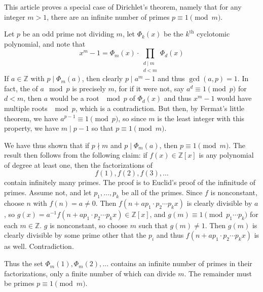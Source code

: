 \documentclass[12pt]{article}
\newcommand{\Ints}{\mathbb{Z}}
\begin{document}
This article proves a special case of Dirichlet's theorem, namely that for any integer $m>1$, there are an infinite number of primes $p\equiv 1\pmod m$. 

Let $p$ be an odd prime not dividing $m$, let $\Phi_k(x)$ be the $k^{\mathrm{th}}$ cyclotomic polynomial, and note that
\[x^m-1=\Phi_m(x)\cdot\prod_{\substack{d\mid m\\d<m}} \Phi_d(x)\]
If $a\in\Ints$ with $p\mid\Phi_m(a)$, then clearly $p\mid a^m-1$ and thus $\gcd(a,p)=1$. In fact, the  of $a\mod p$ is precisely $m$, for if it were not, say $a^d\equiv 1\pmod p$ for $d<m$, then $a$ would be a root $\mod p$ of $\Phi_d(x)$ and thus $x^m-1$ would have multiple roots $\mod p$, which is a contradiction. But then, by Fermat's little theorem, we have $a^{p-1}\equiv 1\pmod p$, so since $m$ is the least integer with this property, we have $m\mid p-1$ so that $p\equiv 1\pmod m$.

We have thus shown that if $p\nmid m$ and $p\mid \Phi_m(a)$, then $p\equiv 1\pmod m$. The result then follows from the following claim: if $f(x)\in \Ints[x]$ is any polynomial of degree at least one, then the factorizations of
\[f(1),f(2),f(3),\ldots\]
contain infinitely many primes. The proof is  to Euclid's proof of the infinitude of primes. Assume not, and let $p_1,\ldots,p_k$ be all of the primes. Since $f$ is nonconstant, choose $n$ with $f(n)=a\neq 0$. Then $f(n+ap_1\cdot p_2\cdots p_kx)$ is clearly divisible by $a$, so $g(x)=a^{-1}f(n+ap_1\cdot p_2\cdots p_kx)\in\Ints[x]$, and $g(m)\equiv 1\pmod {p_1\cdots p_k}$ for each $m\in\Ints$. $g$ is nonconstant, so choose $m$ such that $g(m)\neq 1$. Then $g(m)$ is clearly divisible by some prime other that the $p_i$ and thus $f(n+ap_1\cdot p_2\cdots p_kx)$ is as well. Contradiction.

Thus the set $\Phi_m(1),\Phi_m(2),\ldots$ contains an infinite number of primes in their factorizations, only a finite number of which can divide $m$. The remainder must be primes $p\equiv 1\pmod m$.
\end{document}
